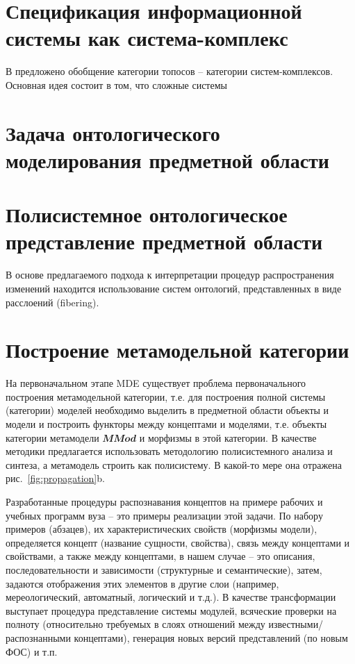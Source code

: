 \documentclass[11pt,draft]{ltxdoc}
\begin{document}
\section{Спецификация информационной системы как система-комплекс}
\label{sec:isassyscomplex}

В \cite{father} предложено обобщение категории топосов -- категории
систем-комплексов.  Основная идея состоит в том, что сложные системы

\section{Задача онтологического моделирования предметной области}
\label{sec:domainontologymodelling}



\section{Полисистемное онтологическое представление предметной области}
\label{sec:polysistemrepresentation}

В основе предлагаемого подхода к интерпретации процедур распространения
изменений находится использование систем онтологий, представленных в виде
расслоений (fibering).

\section{Построение метамодельной категории}
\label{sec:mmod-construction}

На первоначальном этапе MDE существует проблема первоначального построения
метамодельной категории, т.е. для
построения полной системы (категории) моделей необходимо выделить в предметной
области объекты и модели и построить функторы
между концептами и моделями, т.е. объекты категории метамодели $\mathbfit{MMod}$ и
морфизмы в этой категории.  В качестве методики предлагается использовать
методологию полисистемного анализа и синтеза, а метамодель строить как
полисистему.  В какой-то мере она отражена рис.~\ref{fig:propagation}b.

Разработанные процедуры распознавания концептов на примере рабочих и учебных
программ вуза -- это примеры реализации этой задачи.  По набору примеров
(абзацев), их характеристических свойств (морфизмы модели), определяется концепт
(название сущности, свойства), связь между
концептами и свойствами, а также между концептами, в нашем случае -- это
описания, последовательности и зависимости (структурные
и семантические), затем, задаются отображения этих элементов в другие слои
(например, мереологический, автоматный, логический и т.д.).  В качестве
трансформации выступает процедура представление системы модулей, всяческие
проверки на полноту (относительно требуемых в слоях отношений между
известными/распознанными концептами), генерация новых версий представлений (по
новым ФОС) и т.п.
\end{document}
